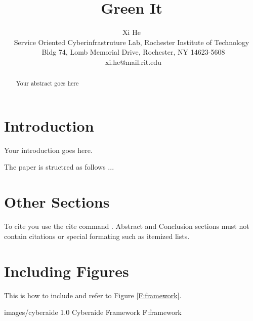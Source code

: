 
\newcommand{\AUTHOR}{%
Xi He\\
Service Oriented Cyberinfrastruture Lab, Rochester Institute of Technology\\
~Bldg 74, Lomb Memorial Drive, Rochester, NY 14623-5608 \\
~xi.he@mail.rit.edu%
}
\newcommand{\TITLE}{Green It}

\TABLEOFCONTENTS

\title{\TITLE}
\author{\AUTHOR}

\maketitle

\begin{abstract}
Your abstract goes here
\end{abstract}

\section{Introduction}

Your introduction goes here. 

The paper is structred as follows ...


\section{Other Sections}

To cite you use the cite command \cite{DBLP:conf/aPcsac/VandersterBD07}. Abstract and Conclusion sections must not contain citations or special formating such as itemized lists.

\section{Including Figures}

This is how to include and refer to Figure \ref{F:framework}.
 

  {images/cyberaide}
  {1.0}
  {Cyberaide Framework}
  {F:framework}

